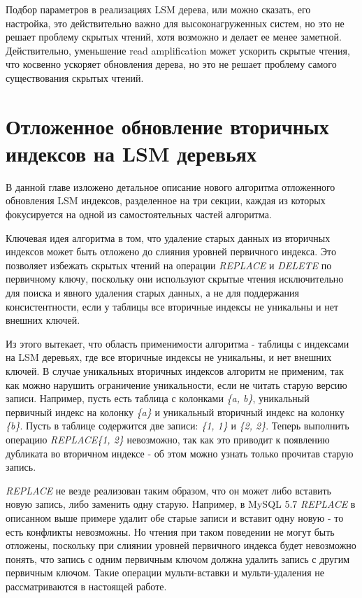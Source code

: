 \documentclass[a4paper,hidelinks,12pt]{article}
\begin{document}
Подбор параметров в реализациях LSM дерева, или можно сказать, его настройка,
это действительно важно для высоконагруженных систем, но это не решает проблему
скрытых чтений, хотя возможно и делает ее менее заметной. Действительно,
уменьшение read amplification может ускорить скрытые чтения, что косвенно
ускоряет обновления дерева, но это не решает проблему самого существования
скрытых чтений.

\section{Отложенное обновление вторичных индексов на LSM деревьях}
В данной главе изложено детальное описание нового алгоритма отложенного
обновления LSM индексов, разделенное на три секции, каждая из которых
фокусируется на одной из самостоятельных частей алгоритма.

Ключевая идея алгоритма в том, что удаление старых данных из вторичных индексов
может быть отложено до слияния уровней первичного индекса. Это позволяет
избежать скрытых чтений на операции \textit{REPLACE} и \textit{DELETE} по
первичному ключу, поскольку они используют скрытые чтения исключительно для
поиска и явного удаления старых данных, а не для поддержания консистентности,
если у таблицы все вторичные индексы не уникальны и нет внешних ключей.

Из этого вытекает, что область применимости алгоритма - таблицы с индексами на
LSM деревьях, где все вторичные индексы не уникальны, и нет внешних ключей. В
случае уникальных вторичных индексов алгоритм не применим, так как можно
нарушить ограничение уникальности, если не читать старую версию записи.
Например, пусть есть таблица с колонками \textit{\{a, b\}}, уникальный первичный
индекс на колонку \textit{\{a\}} и уникальный вторичный индекс на колонку
\textit{\{b\}}. Пусть в таблице содержится две записи: \textit{\{1, 1\}} и
\textit{\{2, 2\}}. Теперь выполнить операцию \textit{REPLACE\{1, 2\}} невозможно,
так как это приводит к появлению дубликата во вторичном индексе - об этом можно
узнать только прочитав старую запись.

\textit{REPLACE} не везде реализован таким образом, что он может либо вставить
новую запись, либо заменить одну старую. Например, в MySQL 5.7 \textit{REPLACE}
в описанном выше примере удалит обе старые записи и вставит одну новую - то есть
конфликты невозможны. Но чтения при таком поведении не могут быть отложены,
поскольку при слиянии уровней первичного индекса будет невозможно понять, что
запись с одним первичным ключом должна удалить запись с другим первичным ключом.
Такие операции мульти-вставки и мульти-удаления не рассматриваются в настоящей
работе.
\end{document}
